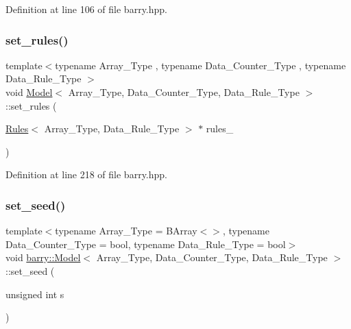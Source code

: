Definition at line 106 of file barry.\+hpp.

\mbox{\label{classbarry_1_1_model_a86a46cf6fdc7c6514b97263f9ee4130b}} 
\subsubsection{\texorpdfstring{set\+\_\+rules()}{set\_rules()}}
{\footnotesize\ttfamily template$<$typename Array\+\_\+\+Type , typename Data\+\_\+\+Counter\+\_\+\+Type , typename Data\+\_\+\+Rule\+\_\+\+Type $>$ \\
void \hyperlink{classbarry_1_1_model}{Model}$<$ Array\+\_\+\+Type, Data\+\_\+\+Counter\+\_\+\+Type, Data\+\_\+\+Rule\+\_\+\+Type $>$\+::set\+\_\+rules (\begin{DoxyParamCaption}\item[{\hyperlink{classbarry_1_1_rules}{Rules}$<$ Array\+\_\+\+Type, Data\+\_\+\+Rule\+\_\+\+Type $>$ $\ast$}]{rules\+\_\+ }\end{DoxyParamCaption})\hspace{0.3cm}{\ttfamily [inline]}}



Definition at line 218 of file barry.\+hpp.

\mbox{\label{classbarry_1_1_model_a175a1772d843dedd603f6bb572cfa30a}} 
\subsubsection{\texorpdfstring{set\+\_\+seed()}{set\_seed()}}
{\footnotesize\ttfamily template$<$typename Array\+\_\+\+Type  = B\+Array$<$$>$, typename Data\+\_\+\+Counter\+\_\+\+Type  = bool, typename Data\+\_\+\+Rule\+\_\+\+Type  = bool$>$ \\
void \hyperlink{classbarry_1_1_model}{barry\+::\+Model}$<$ Array\+\_\+\+Type, Data\+\_\+\+Counter\+\_\+\+Type, Data\+\_\+\+Rule\+\_\+\+Type $>$\+::set\+\_\+seed (\begin{DoxyParamCaption}\item[{unsigned int}]{s }\end{DoxyParamCaption})\hspace{0.3cm}{\ttfamily [inline]}}



